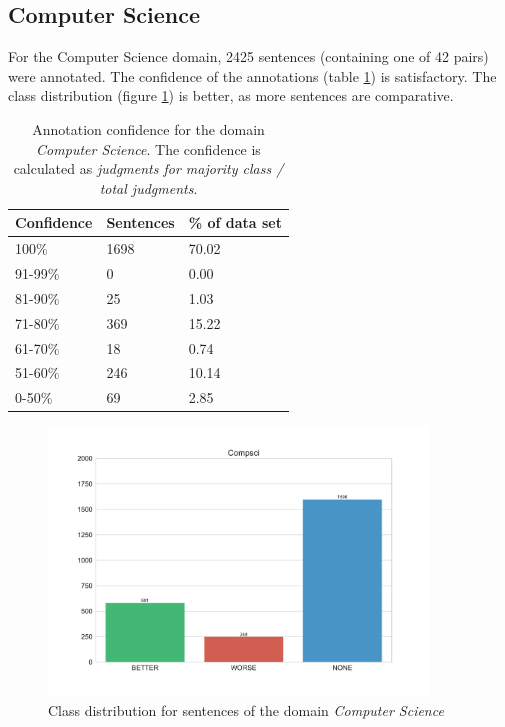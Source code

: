 \subsection{Computer Science}
For the Computer Science domain, 2425 sentences (containing one of 42 pairs) were annotated. The confidence of the annotations (table \ref{fig:compsci_agg}) is satisfactory. The class distribution (figure \ref{fig:compsci_fin}) is better, as more sentences are comparative.

\begin{table}[htb]
\caption{Annotation confidence for the domain \emph{Computer Science}. The confidence is calculated as \emph{judgments for majority class / total judgments}. }
\label{fig:compsci_agg}
\begin{tabularx}{\textwidth}{XXX}
\toprule
Confidence & Sentences & \% of data set \\
\midrule
100\%	&	1698	&	70.02	 \\ 
91-99\%	&	0	&	0.00	 \\ 
81-90\%	&	25	&	1.03	 \\ 
71-80\%	&	369	&	15.22	 \\ 
61-70\%	&	18	&	0.74	 \\ 
51-60\%	&	246	&	10.14	 \\ 
0-50\%	&	69	&	2.85	 \\ 
\bottomrule
\end{tabularx}
\end{table}

\begin{figure}[htb]
\centering
\caption{Class distribution for sentences of the domain \emph{Computer Science}}
\label{fig:compsci_fin}
\includegraphics[width=0.9\textwidth]{images/dataset/Compsci-dist}
\end{figure}

